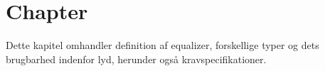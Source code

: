 \chapter{Chapter}\label{kap:chap1}



Dette kapitel omhandler definition af equalizer, forskellige typer
og dets brugbarhed indenfor lyd, herunder også kravspecifikationer.
